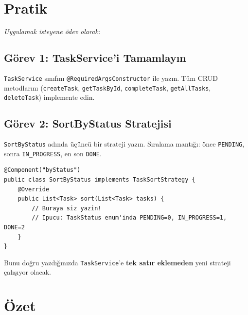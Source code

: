 \documentclass[11pt,a4paper]{article}
\begin{document}
\newpage

\section{Pratik}

{\small \textit{Uygulamak isteyene \"{o}dev olarak:}}

\subsection*{G\"{o}rev 1: TaskService'i Tamamlay{\i}n}

\texttt{TaskService} s{\i}n{\i}f{\i}n{\i} \texttt{@RequiredArgsConstructor} ile yaz{\i}n. T\"{u}m CRUD metodlar{\i}n{\i} (\texttt{createTask}, \texttt{getTaskById}, \texttt{completeTask}, \texttt{getAllTasks}, \texttt{deleteTask}) implemente edin.

\subsection*{G\"{o}rev 2: SortByStatus Stratejisi}

\texttt{SortByStatus} ad{\i}nda \"{u}\c{c}\"{u}nc\"{u} bir strateji yaz{\i}n. S{\i}ralama mant{\i}\u{g}{\i}: \"{o}nce \texttt{PENDING}, sonra \texttt{IN\_PROGRESS}, en son \texttt{DONE}.

\begin{lstlisting}[style=java]
@Component("byStatus")
public class SortByStatus implements TaskSortStrategy {
    @Override
    public List<Task> sort(List<Task> tasks) {
        // Buraya siz yazin!
        // Ipucu: TaskStatus enum'inda PENDING=0, IN_PROGRESS=1, DONE=2
    }
}
\end{lstlisting}

Bunu do\u{g}ru yazd{\i}\u{g}{\i}n{\i}zda \texttt{TaskService}'e \textbf{tek sat{\i}r eklemeden} yeni strateji \c{c}al{\i}\c{s}{\i}yor olacak.

\newpage

\section{\"{O}zet}
\end{document}
